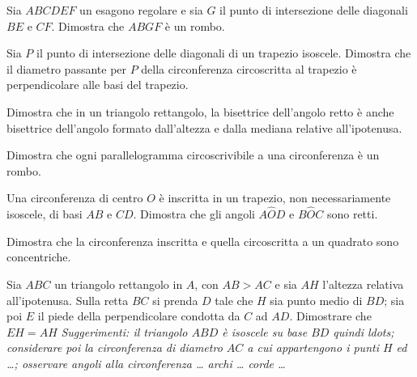 \begin{esercizio}
\label{ese:5.49}
Sia $ABCDEF$ un esagono regolare e sia $G$ il punto di intersezione 
delle diagonali $BE$ e $CF$. Dimostra che $ABGF$ è un rombo.
\end{esercizio}

\begin{esercizio}
\label{ese:5.50}
Sia $P$ il punto di intersezione delle diagonali di un trapezio 
isoscele. Dimostra che il diametro passante per $P$ della 
circonferenza circoscritta al trapezio è perpendicolare alle basi del 
trapezio.
\end{esercizio}

\begin{esercizio}
\label{ese:5.51}
Dimostra che in un triangolo rettangolo, la bisettrice dell'angolo 
retto è anche bisettrice dell'angolo formato dall'altezza e dalla 
mediana relative all'ipotenusa.
\end{esercizio}

\begin{esercizio}
\label{ese:5.52}
Dimostra che ogni parallelogramma circoscrivibile a una circonferenza 
è un rombo.
\end{esercizio}

\begin{esercizio}
\label{ese:5.53}
Una circonferenza di centro $O$ è inscritta in un trapezio, non 
necessariamente isoscele, di basi $AB$ e $CD$. Dimostra che gli 
angoli $A\widehat{O}D$ e $B\widehat{O}C$ sono retti.
\end{esercizio}

\begin{esercizio}
\label{ese:5.54}
Dimostra che la circonferenza inscritta e quella circoscritta a un 
quadrato sono concentriche.
\end{esercizio}

\begin{esercizio}
\label{ese:5.55}
Sia $ABC$ un triangolo rettangolo in $A$, con $AB > AC$ e sia $AH$ 
l'altezza relativa all'ipotenusa. Sulla retta $BC$ si prenda $D$ tale 
che $H$ sia punto medio di $BD$; sia poi $E$ il piede della 
perpendicolare condotta da $C$ ad $AD$. Dimostrare che $EH = AH$  
\emph{Suggerimenti: il triangolo $ABD$ è isoscele su base $BD$ quindi 
ldots{}; considerare poi la circonferenza di diametro $AC$ a cui 
appartengono i punti $H$ ed \ldots{}; osservare angoli alla 
circonferenza \ldots{} archi \ldots{} corde \ldots{}}
\end{esercizio}

